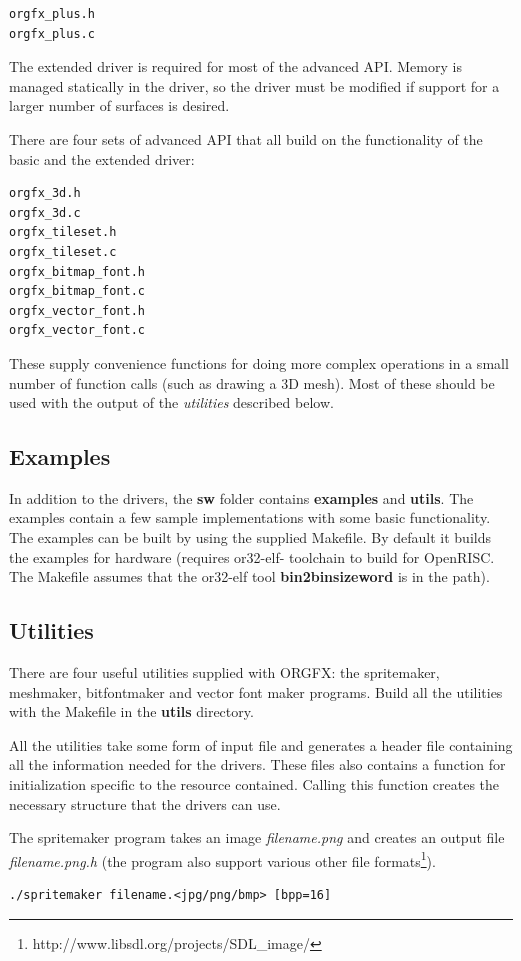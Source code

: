 \documentclass[10pt,a4paper]{article}
\begin{document}
\begin{lstlisting}
orgfx_plus.h
orgfx_plus.c
\end{lstlisting}

The extended driver is required for most of the advanced API. Memory is managed statically in the driver, so the driver must be modified if support for a larger number of surfaces is desired.

There are four sets of advanced API that all build on the functionality of the basic and the extended driver:

\begin{lstlisting}
orgfx_3d.h
orgfx_3d.c
orgfx_tileset.h
orgfx_tileset.c
orgfx_bitmap_font.h
orgfx_bitmap_font.c
orgfx_vector_font.h
orgfx_vector_font.c
\end{lstlisting}

These supply convenience functions for doing more complex operations in a small number of function calls (such as drawing a 3D mesh). Most of these should be used with the output of the \textit{utilities} described below.

\subsection{Examples}
In addition to the drivers, the \textbf{sw} folder contains \textbf{examples}  and \textbf{utils}. The examples contain a few sample implementations with some basic functionality. The examples can be built by using the supplied Makefile. By default it builds the examples for hardware (requires or32-elf- toolchain to build for OpenRISC. The Makefile assumes that the or32-elf tool \textbf{bin2binsizeword} is in the path).

\subsection{Utilities}
There are four useful utilities supplied with ORGFX: the spritemaker, meshmaker, bitfontmaker and vector font maker programs. Build all the utilities with the Makefile in the \textbf{utils} directory.

All the utilities take some form of input file and generates a header file containing all the information needed for the drivers. These files also contains a function for initialization specific to the resource contained. Calling this function creates the necessary structure that the drivers can use.

The spritemaker program takes an image \textit{filename.png} and creates an output file \textit{filename.png.h} (the program also support various other file formats\footnote{http://www.libsdl.org/projects/SDL\_image/}).
\begin{lstlisting}
./spritemaker filename.<jpg/png/bmp> [bpp=16]
\end{lstlisting}
\end{document}
